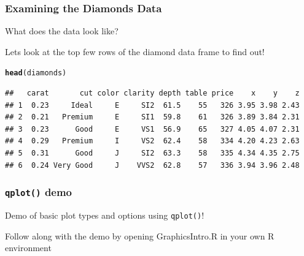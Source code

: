 \documentclass{beamer}\usepackage[]{graphicx}\usepackage[]{color}
\makeatletter
\newcommand{\hlstd}[1]{\textcolor[rgb]{0.345,0.345,0.345}{#1}}%
\newcommand{\hlkwd}[1]{\textcolor[rgb]{0.737,0.353,0.396}{\textbf{#1}}}%
\newenvironment{kframe}{%
 \def\at@end@of@kframe{}%
 \ifinner\ifhmode%
  \def\at@end@of@kframe{\end{minipage}}%
  \begin{minipage}{\columnwidth}%
 \fi\fi%
 \def\FrameCommand##1{\hskip\@totalleftmargin \hskip-\fboxsep
 \colorbox{shadecolor}{##1}\hskip-\fboxsep
     \hskip-\linewidth \hskip-\@totalleftmargin \hskip\columnwidth}%
 \MakeFramed {\advance\hsize-\width
   \@totalleftmargin\z@ \linewidth\hsize
   \@setminipage}}%
 {\par\unskip\endMakeFramed%
 \at@end@of@kframe}
\newenvironment{knitrout}{}{} %
\makeatother
\begin{document}
\begin{frame}[fragile]
\frametitle{Examining the Diamonds Data}
    
What does the data look like?\bigskip

Lets look at the top few rows of the diamond data frame to find out!
    
\footnotesize
\begin{knitrout}\scriptsize
{}\color{fgcolor}\begin{kframe}
\begin{alltt}
\hlkwd{head}\hlstd{(diamonds)}
\end{alltt}
\begin{verbatim}
##   carat       cut color clarity depth table price    x    y    z
## 1  0.23     Ideal     E     SI2  61.5    55   326 3.95 3.98 2.43
## 2  0.21   Premium     E     SI1  59.8    61   326 3.89 3.84 2.31
## 3  0.23      Good     E     VS1  56.9    65   327 4.05 4.07 2.31
## 4  0.29   Premium     I     VS2  62.4    58   334 4.20 4.23 2.63
## 5  0.31      Good     J     SI2  63.3    58   335 4.34 4.35 2.75
## 6  0.24 Very Good     J    VVS2  62.8    57   336 3.94 3.96 2.48
\end{verbatim}
\end{kframe}
\end{knitrout}

\normalsize
\end{frame}


\begin{frame}
\frametitle{\texttt{qplot()} demo}

   Demo of basic plot types and options using \texttt{qplot()}!
   
   \vspace{.2in}
   
   Follow along with the demo by opening GraphicsIntro.R in your own R environment

\end{frame}

\end{document}
